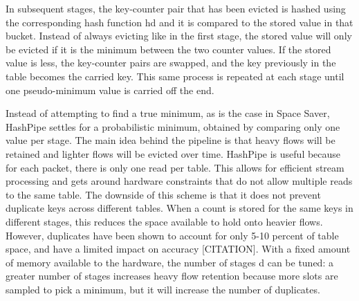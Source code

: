 In subsequent stages, the key-counter pair that has been evicted is hashed using the corresponding hash function hd and it is compared to the stored value in that bucket. Instead of always evicting like in the first stage, the stored value will only be evicted if it is the minimum between the two counter values. If the stored value is less, the key-counter pairs are swapped, and the key previously in the table becomes the carried key. This same process is repeated at each stage until one pseudo-minimum value is carried off the end.

Instead of attempting to find a true minimum, as is the case in Space Saver, HashPipe settles for a probabilistic minimum, obtained by comparing only one value per stage. The main idea behind the pipeline is that heavy flows will be retained and lighter flows will be evicted over time. HashPipe is useful because for each packet, there is only one read per table. This allows for efficient stream processing and gets around hardware constraints that do not allow multiple reads to the same table. The downside of this scheme is that it does not prevent duplicate keys across different tables. When a count is stored for the same keys in different stages, this reduces the space available to hold onto heavier flows. However, duplicates have been shown to account for only 5-10 percent of table space, and have a limited impact on accuracy [CITATION]. With a fixed amount of memory available to the hardware, the number of stages d can be tuned: a greater number of stages increases heavy flow retention because more slots are sampled to pick a minimum, but it will increase the number of duplicates.